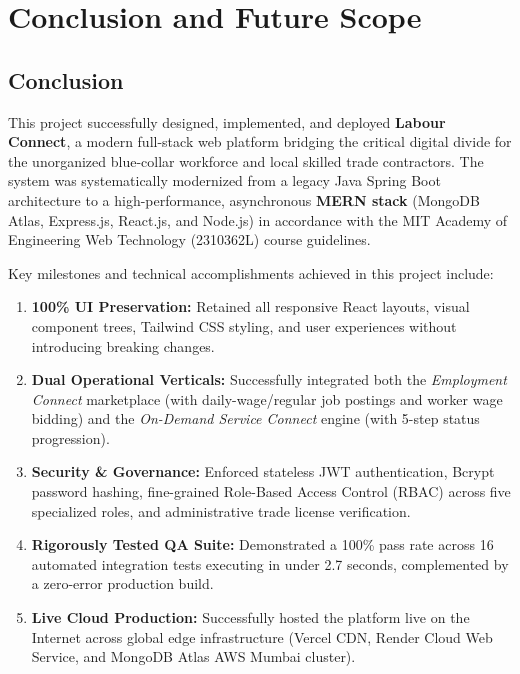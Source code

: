 \newpage
\chapter{Conclusion and Future Scope}

\section{Conclusion}
This project successfully designed, implemented, and deployed \textbf{Labour Connect}, a modern full-stack web platform bridging the critical digital divide for the unorganized blue-collar workforce and local skilled trade contractors. The system was systematically modernized from a legacy Java Spring Boot architecture to a high-performance, asynchronous \textbf{MERN stack} (MongoDB Atlas, Express.js, React.js, and Node.js) in accordance with the MIT Academy of Engineering Web Technology (2310362L) course guidelines.

Key milestones and technical accomplishments achieved in this project include:
\begin{enumerate}
    \item \textbf{100\% UI Preservation:} Retained all responsive React layouts, visual component trees, Tailwind CSS styling, and user experiences without introducing breaking changes.
    \item \textbf{Dual Operational Verticals:} Successfully integrated both the \textit{Employment Connect} marketplace (with daily-wage/regular job postings and worker wage bidding) and the \textit{On-Demand Service Connect} engine (with 5-step status progression).
    \item \textbf{Security \& Governance:} Enforced stateless JWT authentication, Bcrypt password hashing, fine-grained Role-Based Access Control (RBAC) across five specialized roles, and administrative trade license verification.
    \item \textbf{Rigorously Tested QA Suite:} Demonstrated a 100\% pass rate across 16 automated integration tests executing in under 2.7 seconds, complemented by a zero-error production build.
    \item \textbf{Live Cloud Production:} Successfully hosted the platform live on the Internet across global edge infrastructure (Vercel CDN, Render Cloud Web Service, and MongoDB Atlas AWS Mumbai cluster).
\end{enumerate}


